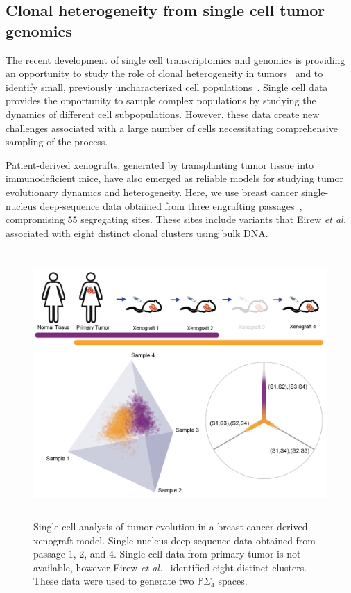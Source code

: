 \documentclass[a4paper,11pt]{article}
\begin{document}
\subsection{Clonal heterogeneity from single cell tumor genomics}

The recent development of single cell transcriptomics and genomics is providing an opportunity to study the role of clonal heterogeneity in tumors~\cite{navin2011tumour, eirew2014dynamics, patel2014single} and to identify small, previously uncharacterized cell populations~\cite{grun2015single}.
Single cell data provides the opportunity to sample complex populations by studying the dynamics of different cell subpopulations.
However, these data create new challenges associated with a large number of cells necessitating comprehensive sampling of the process. 

Patient-derived xenografts, generated by transplanting tumor tissue into immunodeficient mice, have also emerged as reliable models for studying tumor evolutionary dynamics and heterogeneity.
Here, we use breast cancer single-nucleus deep-sequence data obtained from three engrafting passages~\cite{eirew2014dynamics}, compromising 55 segregating sites.
These sites include variants that Eirew \textit{et al.} associated with eight distinct clonal clusters using bulk DNA.

\begin{figure}
    \centering
    \includegraphics[height=4in]{figures/xenograft_single_cell.png}
    \caption{Single cell analysis of tumor evolution in a breast cancer derived xenograft model. Single-nucleus deep-sequence data obtained from passage 1, 2, and 4. Single-cell data from primary tumor is not available, however  Eirew \textit{et al.}~\cite{eirew2014dynamics} identified eight distinct clusters. These data were used to generate two $\mathbb{P}\Sigma_4 $ spaces.}
    \label{fig:xenograft}
\end{figure} 
\end{document}
